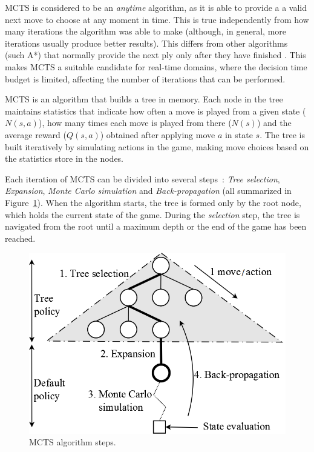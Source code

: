 \documentclass[journal]{IEEEtran}
\begin{document}
MCTS is considered to be an \textit{anytime} algorithm, as it is able to provide a a valid next move to choose at any moment in time. This is true independently from how many iterations the algorithm was able to make (although, in general, more iterations usually produce better results). This differs from other algorithms (such A*) that normally provide the next ply only after they have finished . This makes MCTS a suitable candidate for real-time domains, where the decision time budget is limited, affecting the number of iterations that can be performed.

MCTS is an algorithm that builds a tree in memory. Each node in the tree maintains statistics that indicate how often a move is played from a given state ($N(s,a)$), how many times each move is played from there ($N(s)$) and the average reward ($Q(s,a)$) obtained after applying move $a$ in state $s$. The tree is built iteratively by simulating actions in the game, making move choices based on the statistics store in the nodes. 

Each iteration of MCTS can be divided into several steps~\cite{Gelly2006}: \textit{Tree selection}, \textit{Expansion}, \textit{Monte Carlo simulation} and \textit{Back-propagation} (all summarized in Figure~\ref{fig:mcts}). When the algorithm starts, the tree is formed only by the root node, which holds the current state of the game. During the \textit{selection} step, the tree is navigated from the root until a maximum depth or the end of the game has been reached. 

\begin{figure} [!t]
	\begin{center}
	\includegraphics[scale=0.4,natwidth=708,natheight=484]{img/mcts.png}
	\caption{MCTS algorithm steps.}
	\label{fig:mcts}
	\end{center}
\end{figure}
\end{document}
